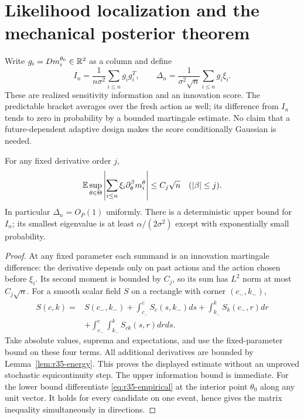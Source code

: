 \section{Likelihood localization and the mechanical posterior theorem}
\label{sec:r35-posterior}
Write $g_i=Dm_i^{\theta_0}\in\mathbb R^2$ as a column and define
\[
 I_n=\frac1{n\sigma^2}\sum_{i\le n}g_ig_i^T,\qquad
 \Delta_n=\frac1{\sigma^2\sqrt n}\sum_{i\le n}g_i\xi_i.
\]
These are realized sensitivity information and an innovation score. The predictable bracket averages over the fresh action as well; its difference from $I_n$ tends to zero in probability by a bounded martingale estimate. No claim that a future-dependent adaptive design makes the score conditionally Gaussian is needed.

\begin{lemma}\label{lem:r35-score}
For any fixed derivative order $j$,
\[
 \mathbb E\sup_{\theta\in\Theta}\left|\sum_{i\le n}\xi_i\partial_\theta^\beta m_i^\theta\right|
 \le C_j\sqrt n\quad(|\beta|\le j).
\]
In particular $\Delta_n=O_P(1)$ uniformly. There is a deterministic upper bound for $I_n$; its smallest eigenvalue is at least $\alpha/(2\sigma^2)$ except with exponentially small probability.
\end{lemma}
\begin{proof}
At any fixed parameter each summand is an innovation martingale difference: the derivative depends only on past actions and the action chosen before $\xi_i$. Its second moment is bounded by $C_j$, so its sum has $L^2$ norm at most $C_j\sqrt n$.
For a smooth scalar field $S$ on a rectangle with corner $(c_-,k_-)$,
\begin{align*}
 S(c,k)={}&S(c_-,k_-)+\int_{c_-}^c S_c(s,k_-)ds
 +\int_{k_-}^k S_k(c_-,r)dr\\
 &+\int_{c_-}^c\int_{k_-}^k S_{ck}(s,r)drds.
\end{align*}
Take absolute values, suprema and expectations, and use the fixed-parameter bound on these four terms. All additional derivatives are bounded by Lemma~\ref{lem:r35-energy}. This proves the displayed estimate without an unproved stochastic equicontinuity step. The upper information bound is immediate. For the lower bound differentiate \eqref{eq:r35-empirical} at the interior point $\theta_0$ along any unit vector. It holds for every candidate on one event, hence gives the matrix inequality simultaneously in directions.
\end{proof}

